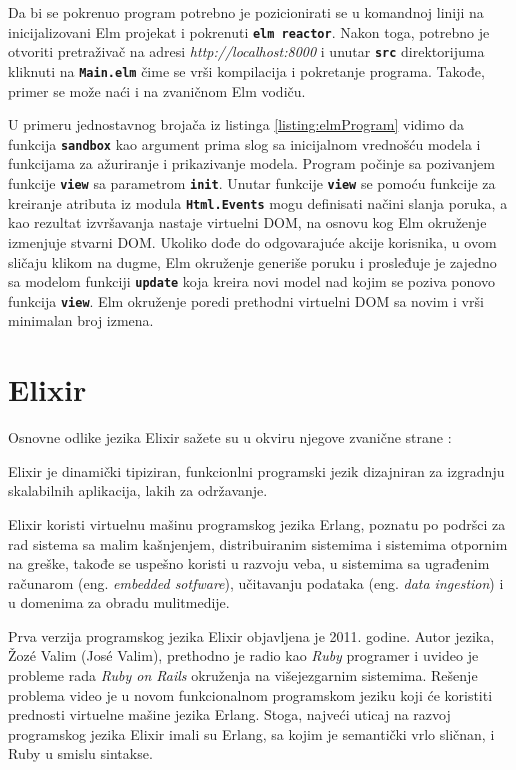 \documentclass[12pt,oneside]{memoir}
\begin{document}
Da bi se pokrenuo program potrebno je pozicionirati se u komandnoj liniji na inicijalizovani
Elm projekat i pokrenuti \texttt{\textbf{elm reactor}}. Nakon toga, potrebno je otvoriti pretraživač na
adresi \emph{http://localhost:8000} i unutar \texttt{\textbf{src}} direktorijuma kliknuti na 
\texttt{\textbf{Main.elm}} čime se vrši kompilacija i pokretanje programa. Takođe, primer se
može naći i na zvaničnom Elm vodiču\cite{elm-program}.

U primeru jednostavnog brojača iz listinga \ref{listing:elmProgram} vidimo da funkcija
\textbf{\texttt{sandbox}} kao argument prima slog sa inicijalnom vrednošću modela i 
funkcijama za ažuriranje i prikazivanje modela. Program počinje sa pozivanjem funkcije
\texttt{\textbf{view}} sa parametrom \texttt{\textbf{init}}. Unutar funkcije
\texttt{\textbf{view}} se pomoću funkcije za kreiranje atributa iz modula
\texttt{\textbf{Html.Events}} mogu definisati načini slanja poruka, a kao rezultat 
izvršavanja nastaje virtuelni DOM, na osnovu kog Elm okruženje izmenjuje stvarni DOM.
Ukoliko dođe do odgovarajuće akcije korisnika, u ovom sličaju klikom na dugme, Elm okruženje
generiše poruku i prosleđuje je zajedno sa modelom funkciji \texttt{\textbf{update}} koja
kreira novi model nad kojim se poziva ponovo funkcija \texttt{\textbf{view}}.
Elm okruženje poredi prethodni virtuelni DOM sa novim i vrši minimalan broj izmena.  

\chapter{Elixir}
Osnovne odlike jezika Elixir sažete su u okviru njegove zvanične strane \cite{elixir}:
\begin{displayquote}
Elixir je dinamički tipiziran, funkcionlni programski jezik dizajniran za izgradnju skalabilnih
aplikacija, lakih za održavanje.

Elixir koristi virtuelnu mašinu programskog jezika Erlang, poznatu po podršci za rad sistema sa malim kašnjenjem,
distribuiranim sistemima i sistemima otpornim na greške, takođe se uspešno koristi u razvoju
veba, u sistemima sa ugrađenim računarom (eng. \emph{embedded sotfware}), učitavanju podataka
(eng. \emph{data ingestion}) i u domenima za obradu mulitmedije.
\end{displayquote}

Prva verzija programskog jezika Elixir objavljena je 2011. godine. Autor jezika, Žozé Valim
(José Valim), prethodno je radio kao \emph{Ruby} programer i uvideo je probleme rada \emph{Ruby
on Rails} okruženja na višejezgarnim sistemima. Rešenje problema video je u novom funkcionalnom
programskom jeziku koji će koristiti prednosti virtuelne mašine jezika Erlang. Stoga, najveći
uticaj na razvoj programskog jezika Elixir imali su Erlang, sa kojim je semantički vrlo sličnan,
i Ruby u smislu sintakse. 
\end{document}
